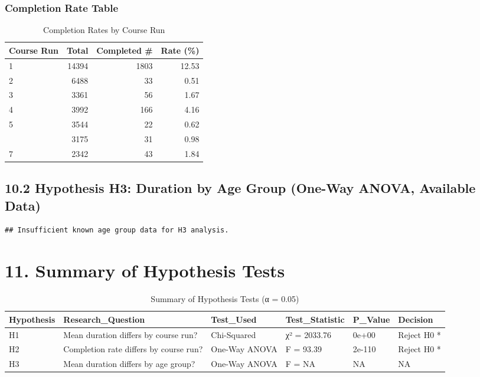 \documentclass[
]{article}
\begin{document}
\subsubsection{Completion Rate Table}\label{completion-rate-table}

\begin{longtable}[t]{lrrr}
\caption{\label{tab:h2-completion-rates}Completion Rates by Course Run}\\
\toprule
Course Run & Total & Completed \# & Rate (\%)\\
\midrule
1 & 14394 & 1803 & 12.53\\
2 & 6488 & 33 & 0.51\\
3 & 3361 & 56 & 1.67\\
4 & 3992 & 166 & 4.16\\
5 & 3544 & 22 & 0.62\\
\addlinespace
6 & 3175 & 31 & 0.98\\
7 & 2342 & 43 & 1.84\\
\bottomrule
\end{longtable}

\subsection{10.2 Hypothesis H3: Duration by Age Group (One-Way ANOVA,
Available
Data)}\label{hypothesis-h3-duration-by-age-group-one-way-anova-available-data}

\begin{verbatim}
## Insufficient known age group data for H3 analysis.
\end{verbatim}

\section{11. Summary of Hypothesis
Tests}\label{summary-of-hypothesis-tests}

\begin{longtable}[t]{llllll}
\caption{\label{tab:hypothesis-summary}Summary of Hypothesis Tests (α = 0.05)}\\
\toprule
Hypothesis & Research\_Question & Test\_Used & Test\_Statistic & P\_Value & Decision\\
\midrule
H1 & Mean duration differs by course run? & Chi-Squared & χ² = 2033.76 & 0e+00 & Reject H0 *\\
H2 & Completion rate differs by course run? & One-Way ANOVA & F = 93.39 & 2e-110 & Reject H0 *\\
H3 & Mean duration differs by age group? & One-Way ANOVA & F = NA & NA & NA\\
\bottomrule
\end{longtable}
\end{document}
